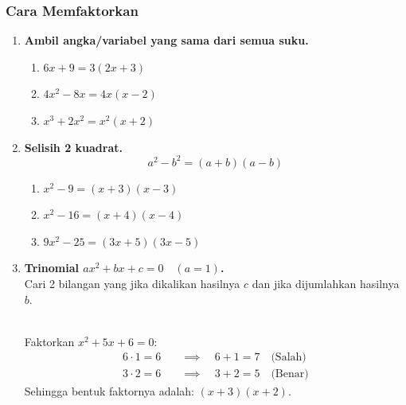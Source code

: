 \subsubsection{Cara Memfaktorkan}
\begin{enumerate}
\item \textbf{Ambil angka/variabel yang sama dari semua suku.}
  \begin{example}
    \hfill 
    \begin{enumerate}
    \item $6x + 9 = 3(2x + 3)$
    \item $4x^2 - 8x = 4x(x - 2)$
    \item $x^3 + 2x^2 = x^2(x + 2)$
    \end{enumerate}
  \end{example}

\item \textbf{Selisih 2 kuadrat.}
  \[ a^2 - b^2 = (a + b)(a - b) \]
  \begin{example}
    \hfill
    \begin{enumerate}
    \item $x^2 - 9 = (x + 3)(x - 3)$
    \item $x^2 - 16 = (x + 4)(x - 4)$
    \item $9x^2 - 25 = (3x + 5)(3x - 5)$
    \end{enumerate}
  \end{example}

\item \textbf{Trinomial $ax^2 + bx + c = 0 \quad (a = 1)$.} \\
  Cari 2 bilangan yang jika dikalikan hasilnya $c$ dan jika dijumlahkan hasilnya $b$.
  \begin{example}[Trinomial]
    \hfill \\
    Faktorkan $x^2 + 5x + 6 = 0$:
    \[
    \begin{aligned}
      6 \cdot 1 = 6 \quad&\implies\quad 6 + 1 = 7 \quad \text{(Salah)} \\
      3 \cdot 2 = 6 \quad&\implies\quad 3 + 2 = 5 \quad \text{(Benar)}
    \end{aligned}
    \]
    Sehingga bentuk faktornya adalah: $(x + 3)(x + 2)$.
  \end{example}


\end{enumerate}
